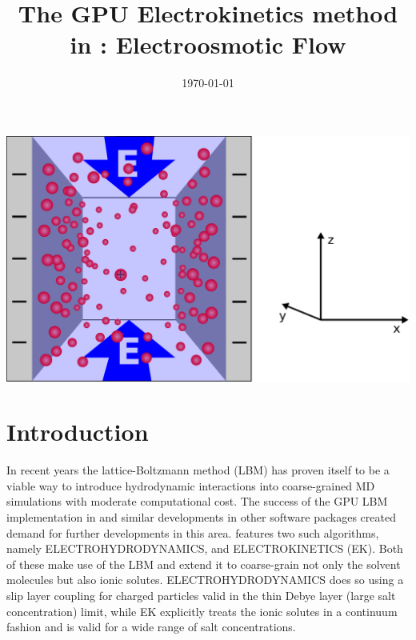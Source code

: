 \renewcommand{\d}{\mathrm d}
\subject{ESPResSo Tutorial}
\title{The GPU Electrokinetics method in \ES{}: 
Electroosmotic Flow
} %
\date{\today}
\publishers{Institute for Computational Physics, University of Stuttgart}
\maketitle 
\begin{center}
  \includegraphics[width=0.7\columnwidth]{figures/schlitzpore_3d.pdf}
\end{center}
\pagebreak
{}

 \tableofcontents
 \pagebreak
  
\section{Introduction}


In recent years the lattice-Boltzmann method (LBM) has proven itself to be a viable way to introduce hydrodynamic interactions into coarse-grained MD simulations with moderate computational cost. The success of the GPU LBM implementation in \ES{} and similar developments in other software packages created demand for further developments in this area. \ES{} features two such algorithms, namely ELECTROHYDRODYNAMICS, and ELECTROKINETICS (EK). Both of these make use of the LBM and extend it to coarse-grain not only the solvent molecules but also ionic solutes. ELECTROHYDRODYNAMICS does so using a slip layer coupling for charged particles valid in the thin Debye layer (large salt concentration) limit, while EK explicitly treats the ionic solutes in a continuum fashion and is valid for a wide range of salt concentrations.


